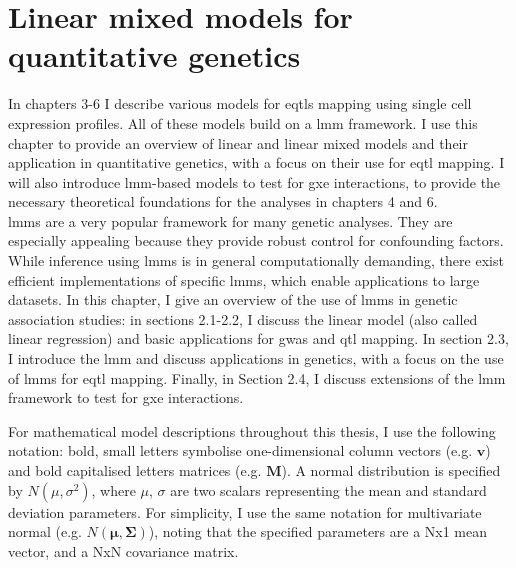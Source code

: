 
\chapter{Linear mixed models for quantitative genetics}

In chapters 3-6 I describe various models for \gls{eqtls} mapping using single cell expression profiles. 
All of these models build on a \gls{lmm} framework. 
I use this chapter to provide an overview of linear and linear mixed models and their application in quantitative genetics, with a focus on their use for \gls{eqtl} mapping. 
I will also introduce \gls{lmm}-based models to test for \gls{gxe} interactions, to provide the necessary theoretical foundations for the analyses in chapters 4 and 6.\\

\gls{lmm}s are a very popular framework for many genetic analyses. 
They are especially appealing because they provide robust control for confounding factors. 
While inference using \gls{lmm}s is in general computationally demanding, there exist efficient implementations of specific \gls{lmm}s, which enable applications to large datasets. 
In this chapter, I give an overview of the use of \gls{lmm}s in genetic association studies: in sections 2.1-2.2, I discuss the linear model (also called linear regression) and basic applications for \gls{gwas} and \gls{qtl} mapping. 
In section 2.3, I introduce the \gls{lmm} and discuss applications in genetics, with a focus on the use of \gls{lmm}s for \gls{eqtl} mapping. 
Finally, in Section 2.4, I discuss extensions of the \gls{lmm} framework to test for \gls{gxe} interactions.\\

\newpage

For mathematical model descriptions throughout this thesis, I use the following notation: bold, small letters symbolise one-dimensional column vectors (e.g. $\mathbf{v}$) and bold capitalised letters matrices (e.g. $\mathbf{M}$). 
A normal distribution is specified by $ N(\mu, \sigma^2)$, where $\mu$, $\sigma$ are two scalars representing the mean and standard deviation parameters.
For simplicity, I use the same notation for multivariate normal (e.g. $ N(\boldsymbol{\mu}, \boldsymbol{\Sigma})$), noting that the specified parameters are a Nx1 mean vector, and a NxN covariance matrix.

